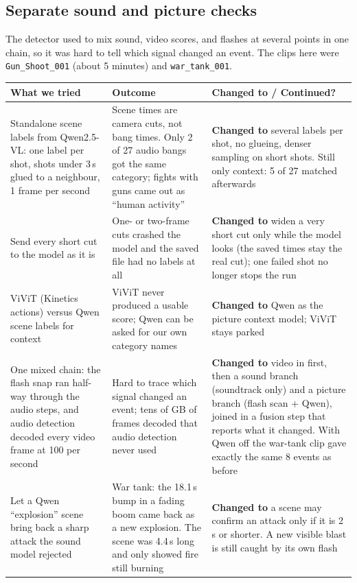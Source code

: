 \documentclass[11pt,a4paper]{article}
\begin{document}
\subsection*{Separate sound and picture checks}
The detector used to mix sound, video scores, and flashes at several points in one chain, so it was hard to tell which signal changed an event. The clips here were \texttt{Gun\_Shoot\_001} (about 5 minutes) and \texttt{war\_tank\_001}.

\begin{center}
\small
\begin{tabularx}{\textwidth}{@{}>{\raggedright\arraybackslash}p{4cm}>{\raggedright\arraybackslash}p{4cm}>{\raggedright\arraybackslash}X@{}}
\toprule
\textbf{What we tried} & \textbf{Outcome} & \textbf{Changed to / Continued?} \\
\midrule
Standalone scene labels from Qwen2.5-VL: one label per shot, shots under 3\,s glued to a neighbour, 1 frame per second & Scene times are camera cuts, not bang times. Only 2 of 27 audio bangs got the same category; fights with guns came out as ``human activity'' & \textbf{Changed to} several labels per shot, no glueing, denser sampling on short shots. Still only context: 5 of 27 matched afterwards \\
\addlinespace
Send every short cut to the model as it is & One- or two-frame cuts crashed the model and the saved file had no labels at all & \textbf{Changed to} widen a very short cut only while the model looks (the saved times stay the real cut); one failed shot no longer stops the run \\
\addlinespace
ViViT (Kinetics actions) versus Qwen scene labels for context & ViViT never produced a usable score; Qwen can be asked for our own category names & \textbf{Changed to} Qwen as the picture context model; ViViT stays parked \\
\addlinespace
One mixed chain: the flash snap ran half-way through the audio steps, and audio detection decoded every video frame at 100 per second & Hard to trace which signal changed an event; tens of GB of frames decoded that audio detection never used & \textbf{Changed to} video in first, then a sound branch (soundtrack only) and a picture branch (flash scan + Qwen), joined in a fusion step that reports what it changed. With Qwen off the war-tank clip gave exactly the same 8 events as before \\
\addlinespace
Let a Qwen ``explosion'' scene bring back a sharp attack the sound model rejected & War tank: the 18.1\,s bump in a fading boom came back as a new explosion. The scene was 4.4\,s long and only showed fire still burning & \textbf{Changed to} a scene may confirm an attack only if it is 2\,s or shorter. A new visible blast is still caught by its own flash \\

\end{tabularx}
\end{center}
\end{document}
